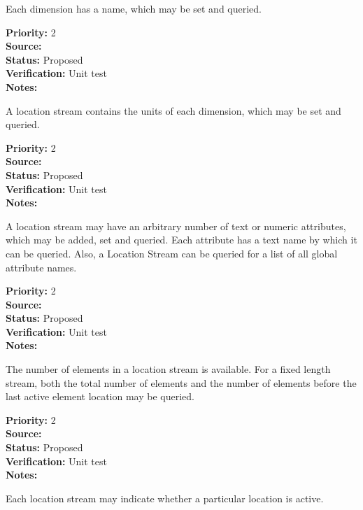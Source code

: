 Each dimension has a name, which may be set and queried.
\begin{reqlist}
{\bf Priority:} 2 \\
{\bf Source:} \\
{\bf Status:} Proposed \\
{\bf Verification:} Unit test \\
{\bf Notes:} 
\end{reqlist}

A location stream contains the units of each dimension, which may be set and queried.
\begin{reqlist}
{\bf Priority:} 2 \\
{\bf Source:} \\
{\bf Status:} Proposed \\
{\bf Verification:} Unit test \\
{\bf Notes:} 
\end{reqlist}


A location stream may have an arbitrary number of text or numeric attributes,
which may be added, set and queried.  Each attribute has a text name by which it
can be queried.  Also, a Location Stream can be queried for a list of all global
attribute names.

\begin{reqlist}
{\bf Priority:} 2 \\
{\bf Source:} \\
{\bf Status:} Proposed \\
{\bf Verification:} Unit test \\
{\bf Notes:} 
\end{reqlist}

The number of elements in a location stream is available.  For a fixed length stream,
both the total number of elements and the number of elements before the last
active element location may be queried.
\begin{reqlist}
{\bf Priority:} 2 \\
{\bf Source:} \\
{\bf Status:} Proposed \\
{\bf Verification:} Unit test \\
{\bf Notes:} 
\end{reqlist}

Each location stream may indicate whether a particular location is active.

